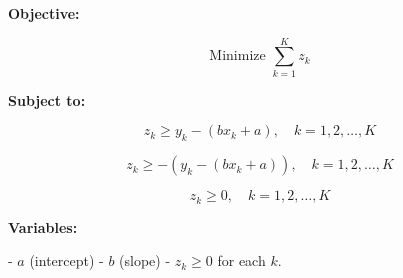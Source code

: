 \documentclass{article}
\begin{document}
\textbf{Objective:}

\[
\text{Minimize } \sum_{k=1}^{K} z_k
\]

\textbf{Subject to:}

\[
z_k \geq y_k - (b x_k + a), \quad k = 1, 2, \ldots, K
\]

\[
z_k \geq - (y_k - (b x_k + a)), \quad k = 1, 2, \ldots, K
\]

\[
z_k \geq 0, \quad k = 1, 2, \ldots, K
\]

\textbf{Variables:}

- \( a \) (intercept)
- \( b \) (slope)
- \( z_k \geq 0 \) for each \( k \).
\end{document}
